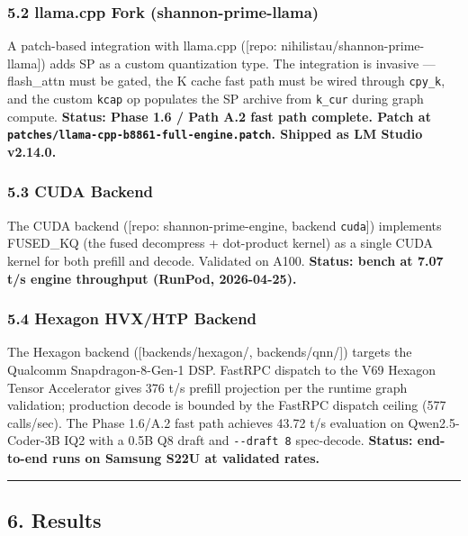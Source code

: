 \documentclass[
  11pt,
]{article}
\begin{document}
\hypertarget{llama.cpp-fork-shannon-prime-llama}{%
\subsubsection{5.2 llama.cpp Fork
(shannon-prime-llama)}\label{llama.cpp-fork-shannon-prime-llama}}

A patch-based integration with llama.cpp ({[}repo:
nihilistau/shannon-prime-llama{]}) adds SP as a custom quantization
type. The integration is invasive --- flash\_attn must be gated, the K
cache fast path must be wired through \texttt{cpy\_k}, and the custom
\texttt{kcap} op populates the SP archive from \texttt{k\_cur} during
graph compute. \textbf{Status: Phase 1.6 / Path A.2 fast path complete.
Patch at \texttt{patches/llama-cpp-b8861-full-engine.patch}. Shipped as
LM Studio v2.14.0.}

\hypertarget{cuda-backend}{%
\subsubsection{5.3 CUDA Backend}\label{cuda-backend}}

The CUDA backend ({[}repo: shannon-prime-engine, backend
\texttt{cuda}{]}) implements FUSED\_KQ (the fused decompress +
dot-product kernel) as a single CUDA kernel for both prefill and decode.
Validated on A100. \textbf{Status: bench at 7.07 t/s engine throughput
(RunPod, 2026-04-25).}

\hypertarget{hexagon-hvxhtp-backend}{%
\subsubsection{5.4 Hexagon HVX/HTP
Backend}\label{hexagon-hvxhtp-backend}}

The Hexagon backend ({[}backends/hexagon/, backends/qnn/{]}) targets the
Qualcomm Snapdragon-8-Gen-1 DSP. FastRPC dispatch to the V69 Hexagon
Tensor Accelerator gives 376 t/s prefill projection per the runtime
graph validation; production decode is bounded by the FastRPC dispatch
ceiling (577 calls/sec). The Phase 1.6/A.2 fast path achieves 43.72 t/s
evaluation on Qwen2.5-Coder-3B IQ2 with a 0.5B Q8 draft and
\texttt{-\/-draft\ 8} spec-decode. \textbf{Status: end-to-end runs on
Samsung S22U at validated rates.}

\begin{center}\rule{0.5\linewidth}{0.5pt}\end{center}

\hypertarget{results}{%
\subsection{6. Results}\label{results}}
\end{document}
